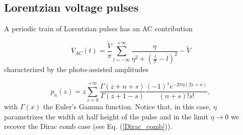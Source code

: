 \documentclass[twocolumn,showpacs,preprintnumbers,amsmath,amssymb%
 aps,
 prb,
 lengthcheck,%
]{revtex4-1}
\def\be{\begin{equation}}
\def\ee{\end{equation}}
\begin{document}
\subsection{Lorentzian voltage pulses}
A periodic train of Lorentzian pulses has an AC contribution  

\be
V_{AC}(t) = \frac{\tilde{V}}{\pi} \sum_{l=-\infty}^{+\infty} \frac{\eta}{\eta^2 + \left( \frac{t}{\mathcal{T}}-l \right)^2}-\tilde{V}
\ee
characterized by the photo-assisted amplitudes \cite{dubois_integer_2013, grenier_fractionalization_2013}

\be
p_{n}(z) =  z \sum_{s=0}^{+\infty} \frac{\Gamma (z+n+s)}{\Gamma(z+1-s)} \frac{(-1)^s e^{-2 \pi \eta (2s+n)}}{(n+s)! s!},
\ee
with $\Gamma(x)$ the Euler's Gamma function. Notice that, in this case, $\eta$ parametrizes the width at half height of the pulse and in the limit $\eta\rightarrow 0$ we recover the Dirac comb case (see Eq. (\ref{Dirac_comb})).  
\end{document}

